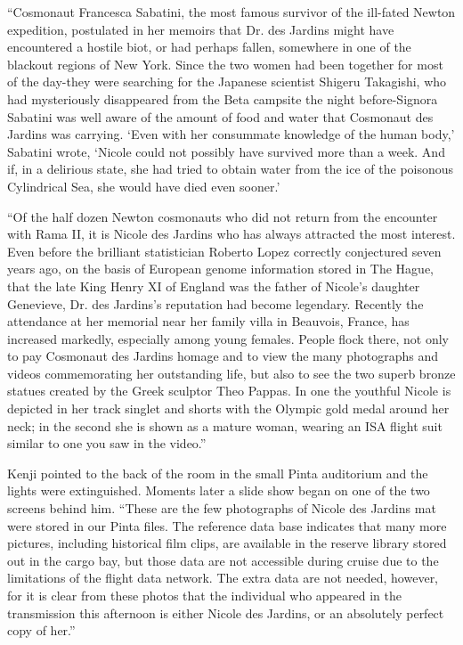 \documentclass[]{article}
\begin{document}
{“Cosmonaut Francesca Sabatini, the most famous survivor of the ill-fated Newton expedition, postulated in her memoirs that Dr.  des Jardins might have encountered a hostile biot, or had perhaps fallen, somewhere in one of the blackout regions of New York.  Since the two women had been together for most of the day-they were searching for the Japanese scientist Shigeru Takagishi, who had mysteriously disappeared from the Beta campsite the night before-Signora Sabatini was well aware of the amount of food and water that Cosmonaut des Jardins was carrying.  ‘Even with her consummate knowledge of the human body,’ Sabatini wrote, ‘Nicole could not possibly have survived more than a week.  And if, in a delirious state, she had tried to obtain water from the ice of the poisonous Cylindrical Sea, she would have died even sooner.’

“Of the half dozen Newton cosmonauts who did not return from the encounter with Rama II, it is Nicole des Jardins who has always attracted the most interest.  Even before the brilliant statistician Roberto Lopez correctly conjectured seven years ago, on the basis of European genome information stored in The Hague, that the late King Henry XI of England was the father of Nicole’s daughter Genevieve, Dr.  des Jardins’s reputation had become legendary.  Recently the attendance at her memorial near her family villa in Beauvois, France, has increased markedly, especially among young females.  People flock there, not only to pay Cosmonaut des Jardins homage and to view the many photographs and videos commemorating her outstanding life, but also to see the two superb bronze statues created by the Greek sculptor Theo Pappas.  In one the youthful Nicole is depicted in her track singlet and shorts with the Olympic gold medal around her neck; in the second she is shown as a mature woman, wearing an ISA flight suit similar to one you saw in the video.”

Kenji pointed to the back of the room in the small Pinta auditorium and the lights were extinguished.  Moments later a slide show began on one of the two screens behind him.  “These are the few photographs of Nicole des Jardins mat were stored in our Pinta files.  The reference data base indicates that many more pictures, including historical film clips, are available in the reserve library stored out in the cargo bay, but those data are not accessible during cruise due to the limitations of the flight data network.  The extra data are not needed, however, for it is clear from these photos that the individual who appeared in the transmission this afternoon is either Nicole des Jardins, or an absolutely perfect copy of her.”

}
\end{document}
